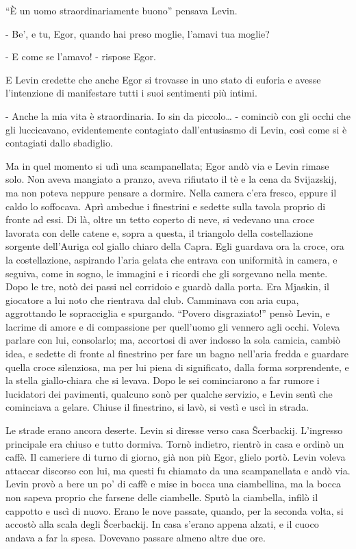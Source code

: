 ``È un uomo straordinariamente buono'' pensava Levin. 

- Be', e tu, Egor, quando hai preso moglie, l'amavi tua moglie? 

- E come se l'amavo! - rispose Egor. 

E Levin credette che anche Egor si trovasse in uno stato di euforia e avesse l'intenzione di manifestare tutti i suoi sentimenti più intimi. 

- Anche la mia vita è straordinaria. Io sin da piccolo\ldots{} - cominciò con gli occhi che gli luccicavano, evidentemente contagiato dall'entusiasmo di Levin, così come si è contagiati dallo sbadiglio. 

Ma in quel momento si udì una scampanellata; Egor andò via e Levin rimase solo. Non aveva mangiato a pranzo, aveva rifiutato il tè e la cena da Svijazskij, ma non poteva neppure pensare a dormire. Nella camera c'era fresco, eppure il caldo lo soffocava. Aprì ambedue i finestrini e sedette sulla tavola proprio di fronte ad essi. Di là, oltre un tetto coperto di neve, si vedevano una croce lavorata con delle catene e, sopra a questa, il triangolo della costellazione sorgente dell'Auriga col giallo chiaro della Capra. Egli guardava ora la croce, ora la costellazione, aspirando l'aria gelata che entrava con uniformità in camera, e seguiva, come in sogno, le immagini e i ricordi che gli sorgevano nella mente. Dopo le tre, notò dei passi nel corridoio e guardò dalla porta. Era Mjaskin, il giocatore a lui noto che rientrava dal club. Camminava con aria cupa, aggrottando le sopracciglia e spurgando. ``Povero disgraziato!'' pensò Levin, e lacrime di amore e di compassione per quell'uomo gli vennero agli occhi. Voleva parlare con lui, consolarlo; ma, accortosi di aver indosso la sola camicia, cambiò idea, e sedette di fronte al finestrino per fare un bagno nell'aria fredda e guardare quella croce silenziosa, ma per lui piena di significato, dalla forma sorprendente, e la stella giallo-chiara che si levava. Dopo le sei cominciarono a far rumore i lucidatori dei pavimenti, qualcuno sonò per qualche servizio, e Levin sentì che cominciava a gelare. Chiuse il finestrino, si lavò, si vestì e uscì in strada. 

Le strade erano ancora deserte. Levin si diresse verso casa Šcerbackij. L'ingresso principale era chiuso e tutto dormiva. Tornò indietro, rientrò in casa e ordinò un caffè. Il cameriere di turno di giorno, già non più Egor, glielo portò. Levin voleva attaccar discorso con lui, ma questi fu chiamato da una scampanellata e andò via. Levin provò a bere un po' di caffè e mise in bocca una ciambellina, ma la bocca non sapeva proprio che farsene delle ciambelle. Sputò la ciambella, infilò il cappotto e uscì di nuovo. Erano le nove passate, quando, per la seconda volta, si accostò alla scala degli Šcerbackij. In casa s'erano appena alzati, e il cuoco andava a far la spesa. Dovevano passare almeno altre due ore. 

